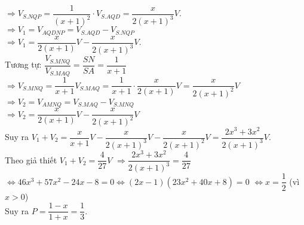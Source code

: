 \begin{ex}
{$ \Rightarrow V_{S.NQP}=\dfrac{1}{(x+1)^2}\cdot V_{S.AQD}=\dfrac{x}{2(x+1)^3}V. $\\
$ \Rightarrow V_1= V_{AQDNP}=V_{S.AQD}-V_{S.NQP}$ \\
$\Rightarrow V_1=\dfrac{x}{2(x+1)}V-\dfrac{x}{2(x+1)^3}V.$\\
Tương tự: $ \dfrac{V_{S.MNQ}}{V_{S.MAQ}}=\dfrac{SN}{SA}=\dfrac{1}{x+1} $\\
$ \Rightarrow V_{S.MNQ}=\dfrac{1}{x+1}V_{S.MAQ}=\dfrac{1}{x+1}\cdot  \dfrac{x}{2(x+1)}V=\dfrac{x}{2(x+1)^2}V$\\
$ \Rightarrow V_2=V_{AMNQ}=V_{S.MAQ}-V_{S.MNQ}$ \\
$ \Rightarrow V_2=\dfrac{x}{2(x+1)}V- \dfrac{x}{2(x+1)^2}V$\\
Suy ra $ V_1+V_2=\dfrac{x}{x+1}V-\dfrac{x}{2(x+1)^3}V-\dfrac{x}{2(x+1)^2}V= \dfrac{2x^3+3x^2}{2(x+1)^3}V.$\\
Theo giả thiết $ V_1+V_2=\dfrac{4}{27}V $
$ \Rightarrow \dfrac{2x^3+3x^2}{2(x+1)^3}=\dfrac{4}{27}$ \\
$\Leftrightarrow 46x^3+57x^2-24x-8=0\Leftrightarrow (2x-1)(23x^2+40x+8)=0 $
$ \Leftrightarrow x=\dfrac{1}{2} $ (vì $ x>0 $)\\
Suy ra $ P=\dfrac{1-x}{1+x}=\dfrac{1}{3}. $
}
\end{ex}
